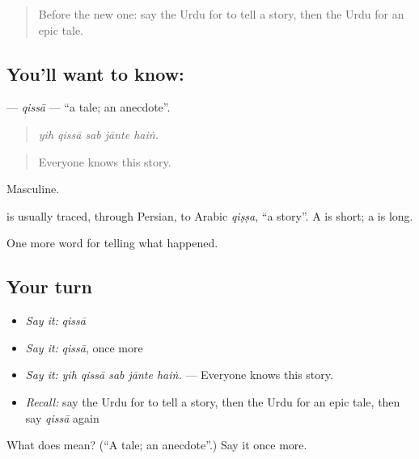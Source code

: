 \begin{quote}
Before the new one: say the Urdu for to tell a story, then the Urdu for an epic tale.
\end{quote}

\subsection*{You'll want to know: }
\textbf{} — \emph{qissā} — \textquotedblleft{}a tale; an anecdote\textquotedblright{}.

\begin{quote}
    
\end{quote}

\begin{quote}
\emph{yih qissā sab jānte haiṅ.}
\end{quote}

\begin{quote}
Everyone knows this story.
\end{quote}

Masculine.

\begin{cousinweb}
is usually traced, through Persian, to Arabic \emph{qiṣṣa}, \textquotedblleft{}a story\textquotedblright{}. A \textbf{} is short; a \textbf{} is long.
\end{cousinweb}

\begin{grammarlens}[title={What you've built}]
One more word for telling what happened.
\end{grammarlens}

\subsection*{Your turn}
\begin{itemize}
\raggedright
  \item \emph{Say it:} \emph{qissā}
  \item \emph{Say it:} \emph{qissā}, once more
  \item \emph{Say it:} \emph{yih qissā sab jānte haiṅ.} — Everyone knows this story.
  \item \emph{Recall:} say the Urdu for to tell a story, then the Urdu for an epic tale, then say \emph{qissā} again
\end{itemize}

\begin{tcolorbox}[breakable,colback=teal!4,colframe=teal!35!black,title={Before you move on}]
What does  mean? (\textquotedblleft{}A tale; an anecdote\textquotedblright{}.) Say it once more.
\end{tcolorbox}
